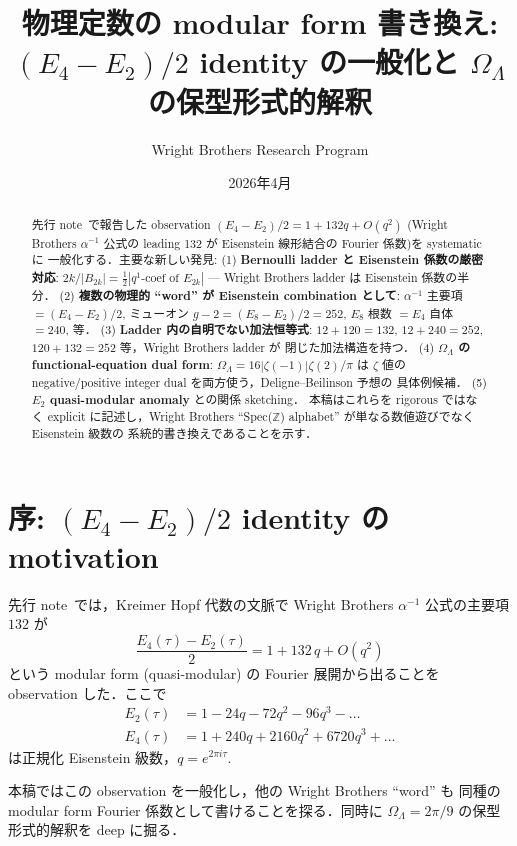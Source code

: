 \documentclass[11pt,a4paper]{article}
\title{物理定数の modular form 書き換え:\\
$(E_4 - E_2)/2$ identity の一般化と $\Omega_\Lambda$ の保型形式的解釈}
\author{Wright Brothers Research Program}
\date{2026年4月}
\begin{document}
\maketitle

\begin{abstract}
先行 note~\cite{kreimer-wb}で報告した observation
$(E_4 - E_2)/2 = 1 + 132q + O(q^2)$ (Wright Brothers $\alpha^{-1}$ 公式の
leading 132 が Eisenstein 線形結合の Fourier 係数)を systematic に
一般化する．主要な新しい発見:
(1) \textbf{Bernoulli ladder と Eisenstein 係数の厳密対応}:
$2k/|B_{2k}| = \frac{1}{2}|q^1\text{-coef of }E_{2k}|$ ---
Wright Brothers ladder は Eisenstein 係数の半分．
(2) \textbf{複数の物理的 ``word'' が Eisenstein combination として}:
$\alpha^{-1}$ 主要項 $= (E_4 - E_2)/2$, ミューオン $g-2 = (E_8 - E_2)/2 = 252$,
$E_8$ 根数 $= E_4$ 自体 $= 240$, 等．
(3) \textbf{Ladder 内の自明でない加法恒等式}: $12 + 120 = 132$,
$12 + 240 = 252$, $120 + 132 = 252$ 等，Wright Brothers ladder が
閉じた加法構造を持つ．
(4) \textbf{$\Omega_\Lambda$ の functional-equation dual form}:
$\Omega_\Lambda = 16|\zeta(-1)|\zeta(2)/\pi$ は $\zeta$ 値の
negative/positive integer dual を両方使う，Deligne--Beilinson 予想の
具体例候補．
(5) \textbf{$E_2$ quasi-modular anomaly} との関係 sketching．
本稿はこれらを rigorous ではなく explicit に記述し，Wright Brothers
``Spec($\mathbb{Z}$) alphabet'' が単なる数値遊びでなく Eisenstein 級数の
系統的書き換えであることを示す．
\end{abstract}

\tableofcontents

\newpage
\section{序: $(E_4 - E_2)/2$ identity の motivation}

先行 note~\cite{kreimer-wb}では，Kreimer Hopf 代数の文脈で
Wright Brothers $\alpha^{-1}$ 公式の主要項 $132$ が
\begin{equation}\label{eq:main-identity}
\frac{E_4(\tau) - E_2(\tau)}{2} = 1 + 132\, q + O(q^2)
\end{equation}
という modular form (quasi-modular) の Fourier 展開から出ることを
observation した．ここで
\begin{align}
E_2(\tau) &= 1 - 24 q - 72 q^2 - 96 q^3 - \ldots\\
E_4(\tau) &= 1 + 240 q + 2160 q^2 + 6720 q^3 + \ldots
\end{align}
は正規化 Eisenstein 級数，$q = e^{2\pi i \tau}$.

本稿ではこの observation を一般化し，他の Wright Brothers ``word'' も
同種の modular form Fourier 係数として書けることを探る．同時に
$\Omega_\Lambda = 2\pi/9$ の保型形式的解釈を deep に掘る．
\end{document}
